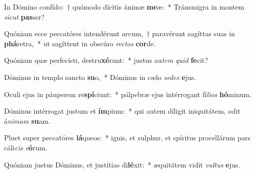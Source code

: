 \item In Dómino confído:~† quómodo dícitis ánimæ \textbf{me}æ:~* Tránsmigra in montem \textit{sic}\textit{ut} \textbf{pas}ser?
\item Quóniam ecce peccatóres intendérunt arcum,~† paravérunt sagíttas suas in \textbf{phá}retra,~* ut sagíttent in obscúro \textit{rec}\textit{tos} \textbf{cor}de.
\item Quóniam quæ perfecísti, destru\textbf{xé}runt:~* justus au\textit{tem} \textit{quid} \textbf{fe}cit?
\item Dóminus in templo sancto \textbf{su}o,~* Dóminus in cælo \textit{se}\textit{des} \textbf{e}jus.
\item Oculi ejus in páuperem re\textbf{spí}ciunt:~* pálpebræ ejus intérrogant fí\textit{li}\textit{os} \textbf{hó}minum.
\item Dóminus intérrogat justum et \textbf{ím}pium:~* qui autem díligit iniquitátem, odit á\textit{ni}\textit{mam} \textbf{su}am.
\item Pluet super peccatóres \textbf{lá}queos:~* ignis, et sulphur, et spíritus procellárum pars cáli\textit{cis} \textit{e}\textbf{ó}rum.
\item Quóniam justus Dóminus, et justítias di\textbf{lé}xit:~* æquitátem vidit \textit{vul}\textit{tus} \textbf{e}jus.
